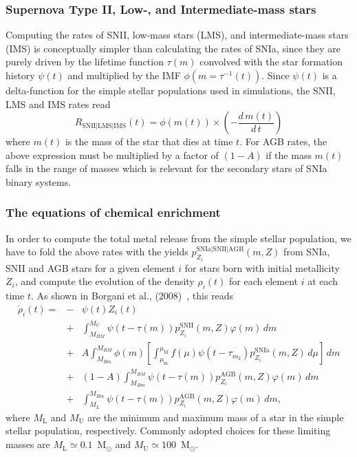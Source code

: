 \documentclass[galaxies,letter,accept,moreauthors,pdftex,10pt,a4paper,usenatbib]{mdpi}
\begin{document}
\subsubsection{Supernova Type II, Low-, and Intermediate-mass stars} 

Computing the rates of SNII, low-mass stars (LMS), and
intermediate-mass stars (IMS) is conceptually simpler than calculating
the rates of SNIa, since they are purely driven by the lifetime
function $\tau(m)$ convolved with the star formation history $\psi(t)$
and multiplied  by the IMF $\phi(m=\tau^{-1}(t))$.  Since $\psi(t)$ is
a delta-function for the simple stellar populations used in
simulations, the SNII, LMS and IMS rates read 
\begin{equation}
R_{\mathrm{SNII|LMS|IMS}}(t)=\phi(m(t)) \times \left( -\frac{d\,m(t)}{d\, t}\right)
\end{equation}
where $m(t)$ is the mass of the star that dies at time $t$.  For AGB
rates, the above expression must be multiplied by a factor of $(1-A)$
if the mass $m(t)$ falls in the range of masses which is relevant for
the secondary stars of SNIa binary systems.

\subsubsection{The equations of chemical enrichment} 
In order to compute the total metal release from the simple stellar
population, we have to fold the above rates with the yields
$p^{\mathrm{SNIa|SNII|AGB}}_{Z_i}(m, Z)$ from SNIa, SNII and AGB stars
for a given element $i$ for stars born with initial metallicity $Z_i$,
and compute the evolution of the density $\rho_i(t)$ for each element
$i$ at each time $t$. As shown in Borgani et al.,
(2008)~\cite{Borgani2008}, this reads
\begin{eqnarray}
\dot{\rho}_i(t)=&-&\psi(t)Z_i(t) \\
&+&\int_{M_{BM}}^{M_{U}} \psi(t-\tau(m))p_{Z_i}^{\mathrm{SNII}}(m, Z)\varphi(m)\,dm \\
&+&A\int_{M_{Bm}}^{M_{BM}}\phi(m)\left[\int_{\mu_{\mathrm m}}^{\mu_{\mathrm M}}
f(\mu)\psi(t-\tau_{m_2})p_{Z_i}^{\mathrm{SNIa}}(m, Z)\,d\mu \right]\, dm \\
&+&(1-A)\int_{M_{Bm}}^{M_{BM}} \psi(t-\tau(m))p_{Z_i}^{\mathrm{AGB}}(m, Z)\varphi(m)\,dm \\
&+&\int_{M_L}^{M_{Bm}}
\psi(t-\tau(m))p_{Z_i}^{\mathrm{AGB}}(m, Z)\varphi(m)\,dm,\label{eq:stev}
\end{eqnarray}
where $M_{\mathrm L}$ and $M_{\mathrm U}$ are the minimum and maximum
mass of a star in the simple stellar population, respectively. Commonly adopted choices for these limiting masses are
$M_{\mathrm L}\simeq 0.1$~M$_\odot$ and $M_{\mathrm U}\simeq 100$~M$_\odot$.
\end{document}
